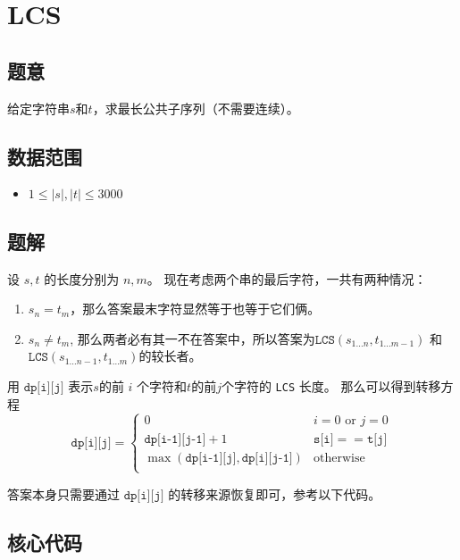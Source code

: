 \section{LCS}
\subsection*{题意}
给定字符串$s$和$t$，求最长公共子序列（不需要连续）。

\subsection*{数据范围}
\begin{itemize}
\item $1 \leq |s|, |t| \leq 3000$
\end{itemize}


\subsection*{题解}

设 $s,t$ 的长度分别为 $n,m$。
现在考虑两个串的最后字符，一共有两种情况：
\begin{enumerate}
\item $s_n = t_m$，那么答案最末字符显然等于也等于它们俩。
\item $s_n \ne t_m$, 那么两者必有其一不在答案中，所以答案为${\texttt{LCS}}(s_{1\ldots n},t_{1\ldots m-1})$ 和${\texttt{LCS}}(s_{1\ldots n-1},t_{1\ldots m})$的较长者。
\end{enumerate}

用 ${\texttt{dp[i][j]}}$ 表示$s$的前 $i$ 个字符和$t$的前$j$个字符的 {\texttt{LCS}} 长度。
那么可以得到转移方程
\begin{equation*}
{\texttt{dp[i][j]}} = 
\begin{cases}
 0 & i = 0 \text{ or } j = 0\\
 {\texttt{dp[i-1][j-1]}} + 1 & {\texttt{s[i]}} == {\texttt{t[j]}}\\
\max({\texttt{dp[i-1][j]}},{\texttt{dp[i][j-1]}}) & \text{otherwise} \\
\end{cases}
\end{equation*}

答案本身只需要通过 ${\texttt{dp[i][j]}}$ 的转移来源恢复即可，参考以下代码。

\subsection*{核心代码}
\inputminted[linenos,autogobble]{cpp}{../Code/F.cpp}
\newpage